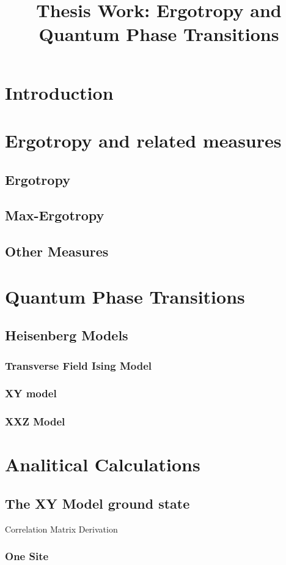 \documentclass[12pt,a4paper]{report}
\title{Thesis Work: Ergotropy and Quantum Phase Transitions }
\author{}
\begin{document}
   \maketitle
\tableofcontents{}

   
\chapter{Introduction}
\chapter{Ergotropy and related measures}
\section{Ergotropy}
\section{Max-Ergotropy}
\section{Other Measures}
\chapter{Quantum Phase Transitions}
\section{Heisenberg Models}
\subsection{Transverse Field Ising Model}
\subsection{XY model}
\subsection{XXZ Model}
\chapter{Analitical Calculations}
\section{The XY Model ground state}
Correlation Matrix Derivation
\clearpage
\subsection{One Site}
\end{document}
